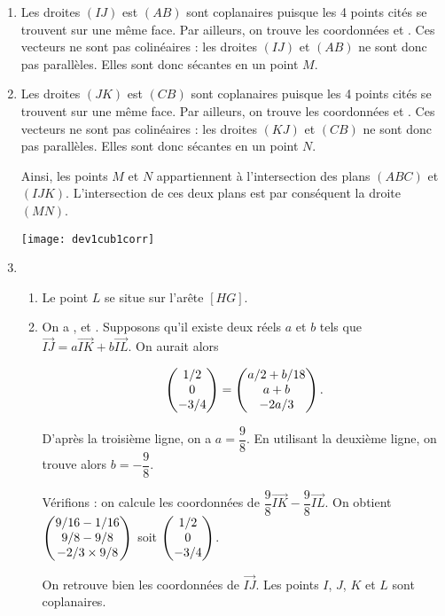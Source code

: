 \documentclass[11pt,fleqn, openany]{book} %
\begin{document}
\begin{solution}\hspace{0pt}

\begin{enumerate}
\item Les droites $(IJ)$ est $(AB)$ sont coplanaires puisque les 4 points cités se trouvent sur une même face. Par ailleurs, on trouve les coordonnées  et . Ces vecteurs ne sont pas colinéaires : les droites $(IJ)$ et $(AB)$ ne sont donc pas parallèles. Elles sont donc sécantes en un point $M$.

\item Les droites $(JK)$ est $(CB)$ sont coplanaires puisque les 4 points cités se trouvent sur une même face. Par ailleurs, on trouve les coordonnées  et . Ces vecteurs ne sont pas colinéaires : les droites $(KJ)$ et $(CB)$ ne sont donc pas parallèles. Elles sont donc sécantes en un point $N$.

Ainsi, les points $M$ et $N$ appartiennent à l'intersection des plans $(ABC)$ et $(IJK)$. L'intersection de ces deux plans est par conséquent la droite $(MN)$.

\begin{center}
\texttt{[image: dev1cub1corr]}
\end{center}

\item \begin{enumerate}
\item Le point $L$ se situe sur l'arête $[HG]$.

\item On a ,  et . Supposons qu'il existe deux réels $a$ et $b$ tels que $\overrightarrow{IJ}=a\overrightarrow{IK}+b\overrightarrow{IL}$. On aurait alors

\[ \coordbe{1/2}{0}{-3/4} = \coordbe{a/2+b/18}{a+b}{-2a/3}.\]

D'après la troisième ligne, on a $a=\dfrac{9}{8}$. En utilisant la deuxième ligne, on trouve alors $b=-\dfrac{9}{8}$.

Vérifions : on calcule les coordonnées de $\dfrac{9}{8}\overrightarrow{IK}-\dfrac{9}{8}\overrightarrow{IL}$. On obtient $ \coordbe{9/16 -1/16}{9/8-9/8}{-2/3 \times 9/8}$ soit $\coordbe{1/2}{0}{-3/4}$.

On retrouve bien les coordonnées de $\overrightarrow{IJ}$. Les points $I$, $J$, $K$ et $L$ sont coplanaires.


\end{enumerate}
\end{enumerate}
\end{solution}
\end{document}

